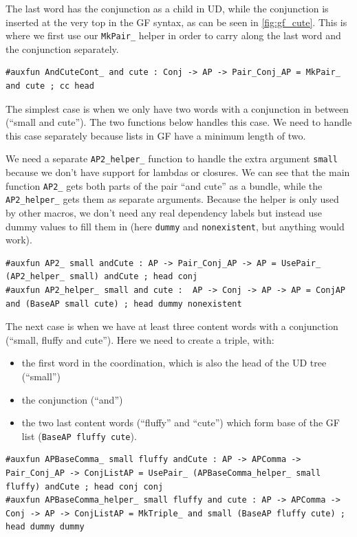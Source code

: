 The last word has the conjunction as a child in UD, while the conjunction is inserted at the very top in the GF syntax, as can be seen in \autoref{fig:gf_cute}. This is where we first use our \verb|MkPair_| helper in order to carry along the last word and the conjunction separately.
\begin{lstlisting}
#auxfun AndCuteCont_ and cute : Conj -> AP -> Pair_Conj_AP = MkPair_ and cute ; cc head
\end{lstlisting}

The simplest case is when we only have two words with a conjunction in between (``small and cute'').
The two functions below handles this case.
We need to handle this case separately because lists in GF have a minimum length of two.

We need a separate \verb|AP2_helper_| function to handle the extra argument \texttt{small} because we don't have support for lambdas or closures. We can see that the main function \verb|AP2_| gets both parts of the pair ``and cute'' as a bundle, while the \verb|AP2_helper_| gets them as separate arguments. Because the helper is only used by other macros, we don't need any real dependency labels but instead use dummy values to fill them in (here \texttt{dummy} and \texttt{nonexistent}, but anything would work).
\begin{lstlisting}
#auxfun AP2_ small andCute : AP -> Pair_Conj_AP -> AP = UsePair_ (AP2_helper_ small) andCute ; head conj
#auxfun AP2_helper_ small and cute :  AP -> Conj -> AP -> AP = ConjAP and (BaseAP small cute) ; head dummy nonexistent
\end{lstlisting}

The next case is when we have at least three content words with a conjunction (``small, fluffy and cute''). Here we need to create a triple, with:
\begin{itemize}
    \item the first word in the coordination, which is also the head of the UD tree (``small'')
    \item the conjunction (``and'')
    \item the two last content words (``fluffy'' and ``cute'') which form base of the GF list (\verb|BaseAP fluffy cute|).
\end{itemize}
\begin{lstlisting}
#auxfun APBaseComma_ small fluffy andCute : AP -> APComma -> Pair_Conj_AP -> ConjListAP = UsePair_ (APBaseComma_helper_ small fluffy) andCute ; head conj conj
#auxfun APBaseComma_helper_ small fluffy and cute : AP -> APComma -> Conj -> AP -> ConjListAP = MkTriple_ and small (BaseAP fluffy cute) ; head dummy dummy
\end{lstlisting}

